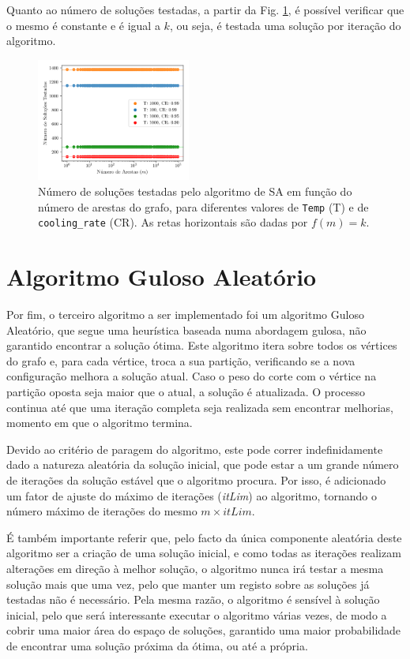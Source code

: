 \documentclass[mirror, portugues]{revdetua}
\begin{document}
Quanto ao número de soluções testadas, a partir da Fig. \ref{fig:sols_satested}, é possível verificar que o mesmo é constante e é igual a $k$, ou seja, é testada uma solução por iteração do algoritmo.

\begin{figure}[H]
    \centering
    \includegraphics[width=0.45\textwidth]{../assets/sols_Simulated .png}
    \caption{Número de soluções testadas pelo algoritmo de SA em função do número de arestas do grafo, para diferentes valores de \texttt{Temp} (T) e de \texttt{cooling\_rate} (CR). As retas horizontais são dadas por $f(m) = k$.}
    \label{fig:sols_satested}
\end{figure}

\section{Algoritmo Guloso Aleatório}

Por fim, o terceiro algoritmo a ser implementado foi um algoritmo Guloso Aleatório, que segue uma heurística baseada numa abordagem gulosa, não garantido encontrar a solução ótima. Este algoritmo itera sobre todos os vértices do grafo e, para cada vértice, troca a sua partição, verificando se a nova configuração melhora a solução atual. Caso o peso do corte com o vértice na partição oposta seja maior que o atual, a solução é atualizada. O processo continua até que uma iteração completa seja realizada sem encontrar melhorias, momento em que o algoritmo termina.

Devido ao critério de paragem do algoritmo, este pode correr indefinidamente dado a natureza aleatória da solução inicial, que pode estar a um grande número de iterações da solução estável que o algoritmo procura. Por isso, é adicionado um fator de ajuste do máximo de iterações (\textit{itLim}) ao algoritmo, tornando o número máximo de iterações do mesmo $m \times itLim$.

É também importante referir que, pelo facto da única componente aleatória deste algoritmo ser a criação de uma solução inicial, e como todas as iterações realizam alterações em direção à melhor solução, o algoritmo nunca irá testar a mesma solução mais que uma vez, pelo que manter um registo sobre as soluções já testadas não é necessário. Pela mesma razão, o algoritmo é sensível à solução inicial, pelo que será interessante executar o algoritmo várias vezes, de modo a cobrir uma maior área do espaço de soluções, garantido uma maior probabilidade de encontrar uma solução próxima da ótima, ou até a própria.
\end{document}
